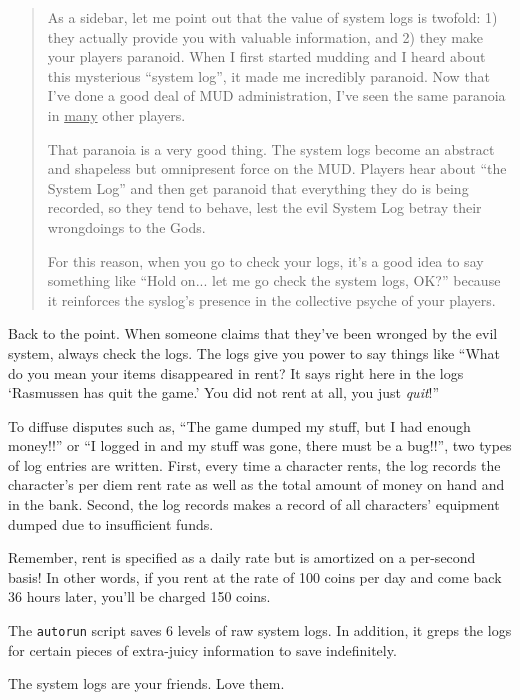 \documentclass[11pt]{article}
\begin{document}
\begin{quote}
As a sidebar, let me point out that the value of system logs is twofold: 1) they actually provide you with valuable information, and 2) they make your players paranoid.  When I first started mudding and I heard about this mysterious ``system log'', it made me incredibly paranoid.  Now that I've done a good deal of MUD administration, I've seen the same paranoia in \underline{many} other players.
\par
That paranoia is a very good thing.  The system logs become an abstract and shapeless but omnipresent force on the MUD.  Players hear about ``the System Log'' and then get paranoid that everything they do is being recorded, so they tend to behave, lest the evil System Log betray their wrongdoings to the Gods.
\par
For this reason, when you go to check your logs, it's a good idea to say something like ``Hold on... let me go check the system logs, OK?'' because it reinforces the syslog's presence in the collective
psyche of your players.
\end{quote}

Back to the point.  When someone claims that they've been wronged by the evil system, always check the logs.  The logs give you power to say things like ``What do you mean your items disappeared in rent?  It says right here in the logs `Rasmussen has quit the game.'  You did not rent at all, you just {\em quit}!''
\par
To diffuse disputes such as, ``The game dumped my stuff, but I had enough money!!'' or ``I logged in and my stuff was gone, there must be a bug!!'', two types of log entries are written.  First, every time a character rents, the log records the character's per diem rent rate as well as the total amount of money on hand and in the bank.  Second, the log records makes a record of all characters' equipment dumped due to insufficient funds.
\par
Remember, rent is specified as a daily rate but is amortized on a per-second basis!  In other words, if you rent at the rate of 100 coins per day and come back 36 hours later, you'll be charged 150 coins.
\par
The \texttt{autorun} script saves 6 levels of raw system logs.  In addition, it greps the logs for certain pieces of extra-juicy information to save indefinitely.
\par
The system logs are your friends.  Love them.
\end{document}
